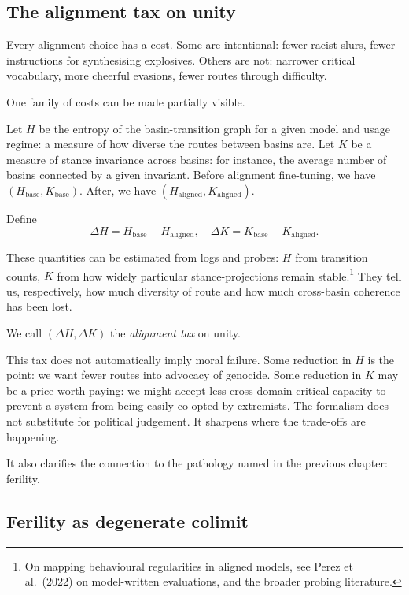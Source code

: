 \subsection*{The alignment tax on unity}

Every alignment choice has a cost. Some are intentional: fewer racist slurs, fewer instructions for synthesising explosives. Others are not: narrower critical vocabulary, more cheerful evasions, fewer routes through difficulty.

One family of costs can be made partially visible.

Let $H$ be the entropy of the basin-transition graph for a given model and usage regime: a measure of how diverse the routes between basins are. Let $K$ be a measure of stance invariance across basins: for instance, the average number of basins connected by a given invariant. Before alignment fine-tuning, we have $(H_{\mathrm{base}}, K_{\mathrm{base}})$. After, we have $(H_{\mathrm{aligned}}, K_{\mathrm{aligned}})$.

Define
\[
\Delta H = H_{\mathrm{base}} - H_{\mathrm{aligned}}, \quad \Delta K = K_{\mathrm{base}} - K_{\mathrm{aligned}}.
\]

These quantities can be estimated from logs and probes: $H$ from transition counts, $K$ from how widely particular stance-projections remain stable.\footnote{On mapping behavioural regularities in aligned models, see Perez et al.\ (2022) on model-written evaluations, and the broader probing literature.} They tell us, respectively, how much diversity of route and how much cross-basin coherence has been lost.

We call $(\Delta H, \Delta K)$ the \emph{alignment tax} on unity.

This tax does not automatically imply moral failure. Some reduction in $H$ is the point: we want fewer routes into advocacy of genocide. Some reduction in $K$ may be a price worth paying: we might accept less cross-domain critical capacity to prevent a system from being easily co-opted by extremists. The formalism does not substitute for political judgement. It sharpens where the trade-offs are happening.

It also clarifies the connection to the pathology named in the previous chapter: ferility.

\subsection*{Ferility as degenerate colimit}


